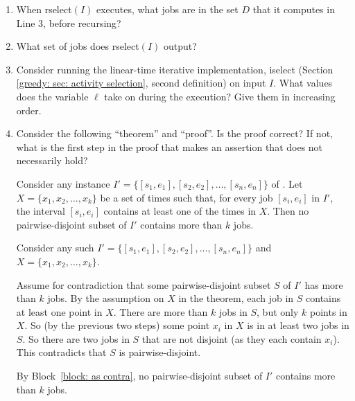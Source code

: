 \documentclass[11pt]{article}
\begin{document}
\begin{enumerate}[label=(\alph*)]

\item When \textsf{rselect}$(I)$ executes, what jobs are in the set $D$ that it computes in Line 3,
  before recursing?

\item What set of jobs does \textsf{rselect}$(I)$ output?

\item Consider running the linear-time iterative implementation, \textsf{iselect} (Section \ref{greedy: sec: activity selection}, second definition)
  on input $I$.  What values does the variable $\ell$ take on during the execution?  Give them in increasing order.

\item Consider the following ``theorem'' and ``proof''.  Is the proof correct?
  If not, what is the first step in the proof that makes an assertion that does not necessarily hold?

  \begin{theorem}
    Consider any instance $I'=\{[s_1, e_1],  [s_2, e_2], \ldots, [s_n, e_n]\}$ of .
    Let $X=\{x_1, x_2, \ldots, x_k\}$ be a set of times such that,
    for every job $[s_i, e_i]$ in $I'$, the interval $[s_i, e_i]$ contains at least one of the times in $X$.
    Then no pairwise-disjoint subset of $I'$ contains more than $k$ jobs.
  \end{theorem}
  \begin{longFormProof}
    \step Consider any such $I'=\{[s_1, e_1],  [s_2, e_2], \ldots, [s_n, e_n]\}$ and $X=\{x_1, x_2, \ldots, x_k\}$.
    \begin{block}\label{block: as contra}
      \step Assume for contradiction that some pairwise-disjoint subset $S$ of $I'$ has more than $k$ jobs.
      \step By the assumption on $X$ in the theorem, each job in $S$ contains at least one point in $X$.
      \step There are more than $k$ jobs in $S$, but only $k$ points in $X$.
      \step So (by the previous two steps) some point $x_i$ in $X$ is in at least two jobs in $S$.
      \step So there are two jobs in $S$ that are not disjoint (as they each contain $x_i$).
      \step This contradicts that $S$ is pairwise-disjoint.
    \end{block}
    \step By Block~\ref{block: as contra}, no pairwise-disjoint subset of $I'$ contains more than $k$ jobs.
  \end{longFormProof}


\end{enumerate}
\end{document}
